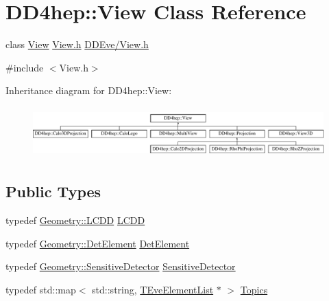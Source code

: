 \hypertarget{class_d_d4hep_1_1_view}{}\section{D\+D4hep\+:\+:View Class Reference}
\label{class_d_d4hep_1_1_view}


class \hyperlink{class_d_d4hep_1_1_view}{View} \hyperlink{_view_8h}{View.\+h} \hyperlink{_view_8h}{D\+D\+Eve/\+View.\+h}  




{\ttfamily \#include $<$View.\+h$>$}

Inheritance diagram for D\+D4hep\+:\+:View\+:\begin{figure}[H]
\begin{center}
\leavevmode
\includegraphics[height=1.964912cm]{class_d_d4hep_1_1_view}
\end{center}
\end{figure}
\subsection*{Public Types}
\begin{DoxyCompactItemize}
\item 
typedef \hyperlink{class_d_d4hep_1_1_geometry_1_1_l_c_d_d}{Geometry\+::\+L\+C\+DD} \hyperlink{class_d_d4hep_1_1_view_ac08032a73da302ae36cd3c7b07b83864}{L\+C\+DD}
\item 
typedef \hyperlink{class_d_d4hep_1_1_geometry_1_1_det_element}{Geometry\+::\+Det\+Element} \hyperlink{class_d_d4hep_1_1_view_a59eafc8150df21b918b964850ac6c462}{Det\+Element}
\item 
typedef \hyperlink{class_d_d4hep_1_1_geometry_1_1_sensitive_detector}{Geometry\+::\+Sensitive\+Detector} \hyperlink{class_d_d4hep_1_1_view_ad8426310f6488c879c008001eb20289e}{Sensitive\+Detector}
\item 
typedef std\+::map$<$ std\+::string, \hyperlink{class_t_eve_element_list}{T\+Eve\+Element\+List} $\ast$ $>$ \hyperlink{class_d_d4hep_1_1_view_aac8510a8567e5e9128020fd81d8f57de}{Topics}
\end{DoxyCompactItemize}
